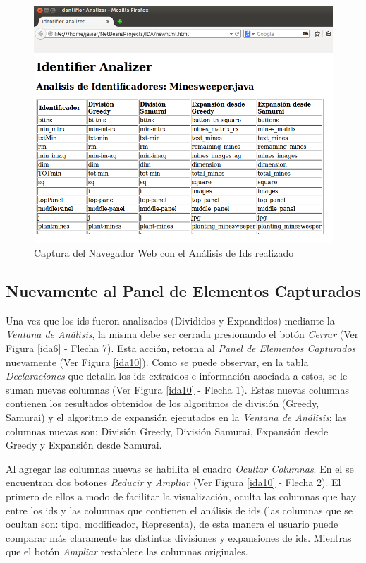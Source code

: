 \begin{figure}[t!] %
\centerline{%
\includegraphics[scale= 0.63]{./cap4/ida_11.png}
}
\caption{Captura del Navegador Web con el Análisis de Ids realizado}
\label{ida11}
\end{figure}

\subsection{Nuevamente al Panel de Elementos Capturados}

Una vez que los ids fueron analizados (Divididos y Expandidos) mediante la \textit{Ventana de Análisis}, la misma debe ser cerrada presionando el botón \textit{Cerrar} (Ver Figura \ref{ida6} - Flecha 7). Esta acción, retorna al \textit{Panel de Elementos Capturados} nuevamente (Ver Figura \ref{ida10}).
Como se puede observar, en la tabla \textit{Declaraciones} que detalla los ids extraídos e información asociada a estos, se le suman nuevas columnas (Ver Figura \ref{ida10} - Flecha 1). Estas nuevas columnas contienen los resultados obtenidos de los algoritmos de división (Greedy, Samurai) y el algoritmo de expansión ejecutados en la \textit{Ventana de Análisis}; las columnas nuevas son: División Greedy, División Samurai, Expansión desde Greedy y Expansión desde Samurai.

Al agregar las columnas nuevas se habilita el cuadro \textit{Ocultar Columnas}. En el se encuentran dos botones \textit{Reducir} y \textit{Ampliar} (Ver Figura \ref{ida10} - Flecha 2). El primero de ellos a modo de facilitar la visualización, oculta las columnas que hay entre los ids y las columnas que contienen el análisis de ids (las columnas que se ocultan son: tipo, modificador, Representa), de esta manera el usuario puede comparar más claramente las distintas divisiones y expansiones de ids. Mientras que el botón \textit{Ampliar} restablece las columnas originales.

